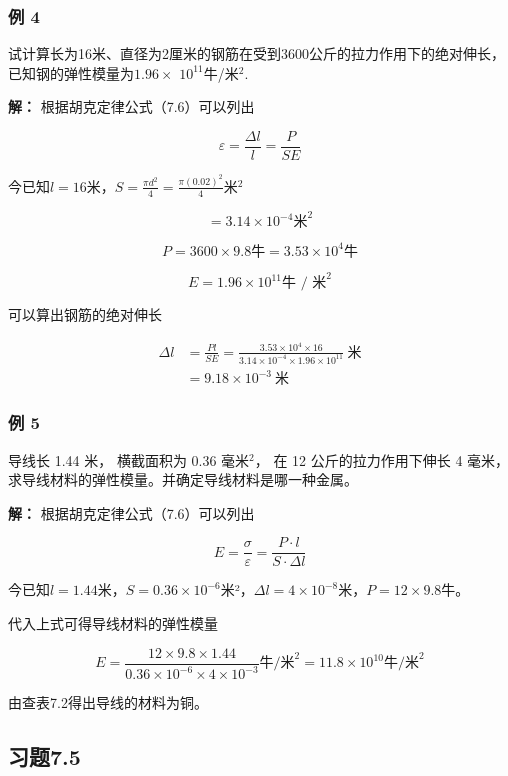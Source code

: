 \subsubsection{例 4}\label{ux4f8b-4-4}

试计算长为16米、直径为2厘米的钢筋在受到3600公斤的拉力作用下的绝对伸长，已知钢的弹性模量为\(1.96\times\)
\(10^{11}\)牛/米\(^{2}\).

\textbf{解：} 根据胡克定律公式（7.6）可以列出

\[
\varepsilon = \frac {\Delta l}{l} = \frac {P}{S E}
\]

今已知\(l = 16\)米，\(S = \frac{\pi d^2}{4} = \frac{\pi(0.02)^2}{4}\)米\(^2\)

\[
= 3.14 \times 10 ^ {- 4} \text{米} ^ {2}
\]

\[
P = 3600 \times 9.8 \text{牛} = 3.53 \times 10 ^ {4} \text{牛}
\]

\[
E = 1.96 \times 10 ^ {11} \text{牛   /   米} ^ {2}
\]

可以算出钢筋的绝对伸长

\[
\begin{aligned}\Delta l&=\frac{Pl}{SE}=\frac{3.53\times10^4\times16}{3.14\times10^{-4}\times1.96\times10^{11}}\ \text{米}\\&=9.18\times10^{-3}\ \text{米}\end{aligned}
\]

\subsubsection{例 5}\label{ux4f8b-5-3}

导线长 1.44 米， 横截面积为 0.36 毫米\(^{2}\)， 在 12
公斤的拉力作用下伸长 4 毫米，
求导线材料的弹性模量。并确定导线材料是哪一种金属。

\textbf{解：} 根据胡克定律公式（7.6）可以列出

\[
E = \frac {\sigma}{\varepsilon} = \frac {P \cdot l}{S \cdot \Delta l}
\]

今已知\(l = 1.44\)米，\(S = 0.36 \times 10^{-6}\)米²，\(\Delta l = 4 \times 10^{-8}\)米，\(P = 12 \times 9.8\)牛。

代入上式可得导线材料的弹性模量

\[
E = \frac {12 \times 9.8 \times 1.44}{0.36 \times 10 ^ {- 6} \times 4 \times 10 ^ {- 3}} \text{牛/米} ^ {2} = 11.8 \times 10 ^ {10} \text{牛/米} ^ {2}
\]

由查表7.2得出导线的材料为铜。

\subsection{习题7.5}\label{ux4e60ux98987.5}

